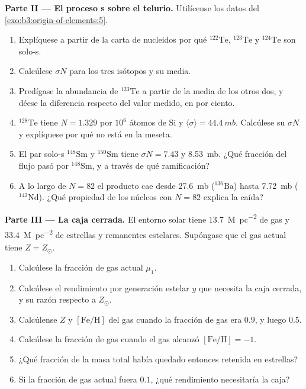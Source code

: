 \begin{problem}
\medskip\noindent\textbf{Parte II --- El proceso s sobre el telurio.} Utilícense
los datos del \cref{exo:b3:origin-of-elements:5}.
\begin{enumerate}[resume]
\item Explíquese a partir de la carta de nucleidos por qué $^{122}\mathrm{Te}$,
  $^{123}\mathrm{Te}$ y $^{124}\mathrm{Te}$ son solo-s.
\item Calcúlese $\sigma N$ para los tres isótopos y su media.
\item Predígase la abundancia de $^{123}\mathrm{Te}$ a partir de la media de los
  otros dos, y déese la diferencia respecto del valor medido, en por
  ciento.
\item $^{128}\mathrm{Te}$ tiene $N = 1.329$ por $10^6$ átomos de Si y
  $\langle\sigma\rangle = \qty{44.4}{mb}$. Calcúlese su $\sigma N$ y
  explíquese por qué no está en la meseta.
\item El par solo-s $^{148}\mathrm{Sm}$ y $^{150}\mathrm{Sm}$ tiene
  $\sigma N = \num{7.43}$ y \qty{8.53}{mb}. ¿Qué fracción del flujo
  pasó por $^{148}\mathrm{Sm}$, y a través de qué ramificación?
\item A lo largo de $N = 82$ el producto cae desde \qty{27.6}{mb}
  ($^{136}\mathrm{Ba}$) hasta \qty{7.72}{mb} ($^{142}\mathrm{Nd}$). ¿Qué
  propiedad de los núcleos con $N = 82$ explica la caída?
\end{enumerate}

\medskip\noindent\textbf{Parte III --- La caja cerrada.} El entorno solar
tiene \qty{13.7}{M_\odot.pc^{-2}} de gas y
\qty{33.4}{M_\odot.pc^{-2}} de estrellas y remanentes estelares. Supóngase que el
gas actual tiene $Z = Z_\odot$.
\begin{enumerate}[resume]
\item Calcúlese la fracción de gas actual $\mu_1$.
\item Calcúlese el rendimiento por generación estelar $y$ que necesita la caja
  cerrada, y su razón respecto a $Z_\odot$.
\item Calcúlense $Z$ y $[\mathrm{Fe/H}]$ del gas cuando la fracción de gas
  era $0.9$, y luego $0.5$.
\item Calcúlese la fracción de gas cuando el gas alcanzó
  $[\mathrm{Fe/H}] = -1$.
\item ¿Qué fracción de la masa total había quedado entonces retenida en estrellas?
\item Si la fracción de gas actual fuera $0.1$, ¿qué rendimiento necesitaría
  la caja?
\end{enumerate}


\end{problem}
